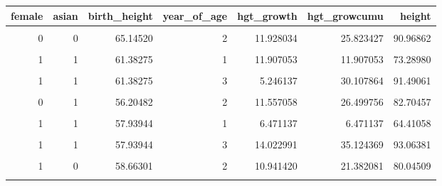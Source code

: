 \documentclass[
]{book}
\begin{document}
\begin{table}[!h]
\centering
\begin{tabular}{r|r|r|r|r|r|r}
\hline
female & asian & birth\_height & year\_of\_age & hgt\_growth & hgt\_growcumu & height\\
\hline
\cellcolor{gray!6}{0} & \cellcolor{gray!6}{0} & \cellcolor{gray!6}{65.14520} & \cellcolor{gray!6}{1} & \cellcolor{gray!6}{13.895393} & \cellcolor{gray!6}{13.895393} & \cellcolor{gray!6}{79.04059}\\
\hline
0 & 0 & 65.14520 & 2 & 11.928034 & 25.823427 & 90.96862\\
\hline
\cellcolor{gray!6}{0} & \cellcolor{gray!6}{0} & \cellcolor{gray!6}{65.14520} & \cellcolor{gray!6}{3} & \cellcolor{gray!6}{11.405068} & \cellcolor{gray!6}{37.228495} & \cellcolor{gray!6}{102.37369}\\
\hline
1 & 1 & 61.38275 & 1 & 11.907053 & 11.907053 & 73.28980\\
\hline
\cellcolor{gray!6}{1} & \cellcolor{gray!6}{1} & \cellcolor{gray!6}{61.38275} & \cellcolor{gray!6}{2} & \cellcolor{gray!6}{12.954674} & \cellcolor{gray!6}{24.861727} & \cellcolor{gray!6}{86.24448}\\
\hline
1 & 1 & 61.38275 & 3 & 5.246137 & 30.107864 & 91.49061\\
\hline
\cellcolor{gray!6}{0} & \cellcolor{gray!6}{1} & \cellcolor{gray!6}{56.20482} & \cellcolor{gray!6}{1} & \cellcolor{gray!6}{14.942698} & \cellcolor{gray!6}{14.942698} & \cellcolor{gray!6}{71.14751}\\
\hline
0 & 1 & 56.20482 & 2 & 11.557058 & 26.499756 & 82.70457\\
\hline
\cellcolor{gray!6}{0} & \cellcolor{gray!6}{1} & \cellcolor{gray!6}{56.20482} & \cellcolor{gray!6}{3} & \cellcolor{gray!6}{12.085305} & \cellcolor{gray!6}{38.585060} & \cellcolor{gray!6}{94.78988}\\
\hline
1 & 1 & 57.93944 & 1 & 6.471137 & 6.471137 & 64.41058\\
\hline
\cellcolor{gray!6}{1} & \cellcolor{gray!6}{1} & \cellcolor{gray!6}{57.93944} & \cellcolor{gray!6}{2} & \cellcolor{gray!6}{14.630242} & \cellcolor{gray!6}{21.101379} & \cellcolor{gray!6}{79.04082}\\
\hline
1 & 1 & 57.93944 & 3 & 14.022991 & 35.124369 & 93.06381\\
\hline
\cellcolor{gray!6}{1} & \cellcolor{gray!6}{0} & \cellcolor{gray!6}{58.66301} & \cellcolor{gray!6}{1} & \cellcolor{gray!6}{10.440660} & \cellcolor{gray!6}{10.440660} & \cellcolor{gray!6}{69.10367}\\
\hline
1 & 0 & 58.66301 & 2 & 10.941420 & 21.382081 & 80.04509\\
\hline
\cellcolor{gray!6}{1} & \cellcolor{gray!6}{0} & \cellcolor{gray!6}{58.66301} & \cellcolor{gray!6}{3} & \cellcolor{gray!6}{7.891597} & \cellcolor{gray!6}{29.273678} & \cellcolor{gray!6}{87.93669}\\
\hline
\end{tabular}
\end{table}
\end{document}
